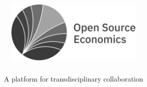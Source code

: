 \title{\includegraphics[height=3.0cm]{material/crop-ose-logo-black-white.pdf}\hspace{6.1cm}}
\subtitle{A platform for transdisciplinary collaboration}
\author{}
\date{}
